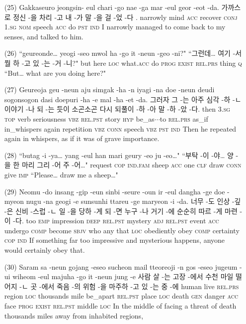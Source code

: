 \begin{itemize}
\item [(25)]
\tgl
		{Gakkaseuro jeongsin- eul chari -go nae -ga mar -eul geor -eot -da.}
		{가까스로 정신 -을 차리 -고 내 -가 말 -을 걸 -었 -다 .}
		{narrowly	mind	\textsc{acc}	recover	\textsc{conj}	\textsc{1.sg}	\textsc{nom}	speech	\textsc{acc}	do	\textsc{pst}	\textsc{ind}}
		{I narrowly managed to come back to my senses, and talked to him.}
		
\item [(26)]
\tgl
		{``geureonde… yeogi -seo mwol ha -go it -neun -geo -ni?"}
		{``그런데… 여기 -서 뭘 하 -고 있 -는 -거 -니?"}
		{but	here	\textsc{loc}	what.\textsc{acc}	do	\textsc{prog}	\textsc{exist}	\textsc{rel.prs}	thing	\textsc{q}	}
		{``But… what are you doing here?"}
		
\item [(27)]
\tgl
		{Geureoja geu -neun aju simgak -ha -n iyagi -na doe -neun deudi sogonsogon dasi doepuri -ha -e mal -ha -et -da.}
		{그러자 그 -는 아주 심각 -하 -ㄴ 이야기 -나 되 -는 듯이 소곤소곤 다시 되풀이 -하 -아 말 -하 -았 -다.}
		{then	\textsc{3.sg}	\textsc{top}	verb	seriousness	\textsc{vbz}	\textsc{rel.pst}	story	\textsc{hyp}	be\_as$\cdots$to	\textsc{rel.prs}	as\_if	in\_whispers	again	repetition	\textsc{vbz}	\textsc{conn}	speech	\textsc{vbz}	\textsc{pst}	\textsc{ind}}
		{Then he repeated again in whispers, as if it was of grave importance.}
		
\item [(28)]
\tgl
		{``butag -i -ya… yang -eul han mari geury -eo ju -eo…"}
		{``부탁 -이 -야… 양 -을 한 마리 그리 -어 주 -어…"}
		{request	\textsc{cop}	\textsc{ind.fam}	sheep	\textsc{acc}	one	\textsc{clf}	draw	\textsc{conn}	give	\textsc{imp}}
		{``Please… draw me a sheep…"}
		
\item [(29)]
\tgl
		{Neomu -do insang -gip -eun sinbi -seure -oun ir -eul dangha -ge doe -myeon nugu -na geogi -e sunsunhi ttareu -ge maryeon -i -da.}
		{너무 -도 인상 -깊 -은 신비 -스럽 -ㄴ 일 -을 당하 -게 되 -면 누구 -나 거기 -에 순순히 따르 -게 마련 -이 -다.}
		{too	\textsc{emp}	impression	\textsc{deep}	\textsc{rel.pst}	mystery	\textsc{adj}	\textsc{rel.pst}	event	\textsc{acc}	undergo	\textsc{comp}	become	\textsc{sbjv}	who	any	that	\textsc{loc}	obediently	obey	\textsc{comp}	certainty	\textsc{cop}	\textsc{ind}}
		{If something far too impressive and mysterious happens, anyone would certainly obey that.}
		
\item [(30)]
\tgl
		{Saram sa -neun gojang -eseo sucheon mail tteoreoji -n gos -eseo jugeum -ui wiheom -eul majuha -go it -neun jung -e}
		{사람 살 -는 고장 -에서 수천 마일 떨어지 -ㄴ 곳 -에서 죽음 -의 위험 -을 마주하 -고 있 -는 중 -에}
		{human	live	\textsc{rel.prs}	region	\textsc{loc}	thousands	mile	be\_apart	\textsc{rel.pst}	place	\textsc{loc}	death	\textsc{gen}	danger	\textsc{acc}	face	\textsc{prog}	\textsc{exist}	\textsc{rel.pst}	middle	\textsc{loc}}
		{In the middle of facing a threat of death thousands miles away from inhabited regions,}


\end{itemize}
